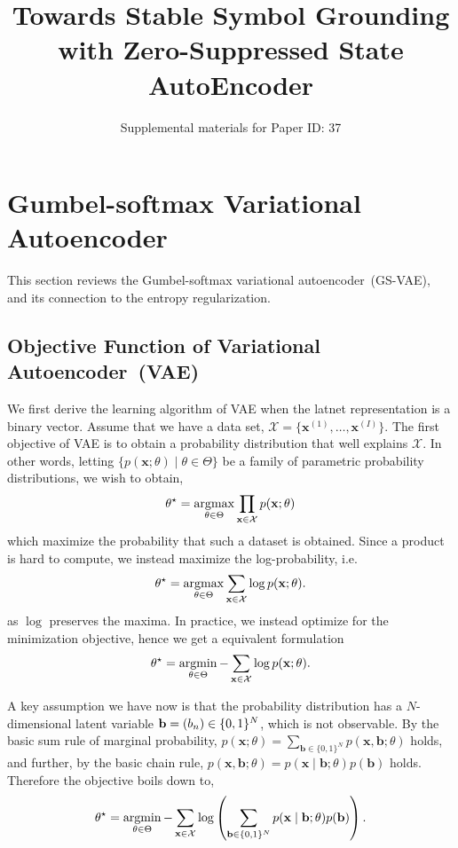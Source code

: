 \documentclass[10pt,letterpaper]{article}
\author{Supplemental materials for Paper ID: 37}
\title{Towards Stable Symbol Grounding\\ with Zero-Suppressed State AutoEncoder}
\newcommand{\argmin}{\mathop{\rm argmin}}
\newcommand{\argmax}{\mathop{\rm argmax}}
\begin{document}
\maketitle

\section{Gumbel-softmax Variational Autoencoder}
\label{gumbel-softmax-theory}
This section reviews the Gumbel-softmax variational autoencoder~(GS-VAE), and its connection to the entropy regularization.

\subsection{Objective Function of Variational Autoencoder~(VAE)}
We first derive the learning algorithm of VAE when the latnet representation is a binary vector.
Assume that we have a data set, $\mathcal{X}=\{\mathbf{x}^{(1)},\dots,\mathbf{x}^{(I)}\}$.
The first objective of VAE is to obtain a probability distribution that well explains $\mathcal{X}$.
In other words, letting $\{p(\mathbf{x};\theta) \mid \theta\in\Theta\}$ be a family of parametric probability distributions, we wish to obtain,
\begin{align*}
\theta^\star = \argmax_{\theta\in\Theta} \prod_{\mathbf{x}\in \mathcal{X}} p(\mathbf{x};\theta)
\end{align*}
which maximize the probability that such a dataset is obtained. Since a product is hard to compute, we instead maximize the log-probability, i.e.
\begin{align*}
\theta^\star = \argmax_{\theta\in\Theta} \sum_{\mathbf{x}\in \mathcal{X}} \log p(\mathbf{x};\theta).
\end{align*}
as $\log$ preserves the maxima.
In practice, we instead optimize for the minimization objective, hence we get a equivalent formulation
\begin{align*}
\theta^\star = \argmin_{\theta\in\Theta} - \sum_{\mathbf{x}\in \mathcal{X}} \log p(\mathbf{x};\theta).
\end{align*}


A key assumption we have now is that the probability distribution has a $N$-dimensional latent variable $\mathbf{b}={\left(b_n\right)}\in\{0,1\}^N$, which is not observable.
By the basic sum rule of marginal probability,
$p(\mathbf{x};\theta) = \sum_{\mathbf{b}\in\{0,1\}^N}p(\mathbf{x}, \mathbf{b};\theta)$ holds, and further,
by the basic chain rule,
$p(\mathbf{x}, \mathbf{b};\theta) = p(\mathbf{x} \mid \mathbf{b};\theta)p(\mathbf{b})$ holds.
Therefore the objective boils down to,
\begin{align}
\label{eq:vae-obj} \theta^\star = \argmin_{\theta\in\Theta} -\sum_{\mathbf{x}\in \mathcal{X}} \log \left(\sum_{\mathbf{b}\in\{0,1\}^N}p(\mathbf{x} \mid \mathbf{b};\theta)p(\mathbf{b})\right).
\end{align}
\end{document}

